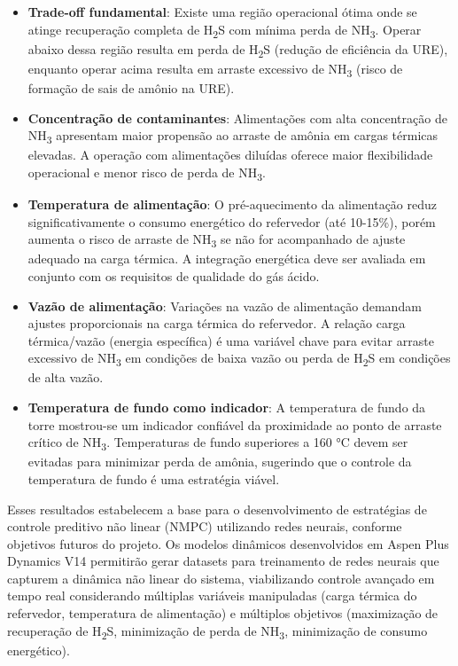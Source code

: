 \begin{itemize}[leftmargin=4em, itemsep=0pt]
  \item \textbf{Trade-off fundamental}: Existe uma região operacional ótima onde se atinge recuperação completa de H\textsubscript{2}S com mínima perda de NH\textsubscript{3}. Operar abaixo dessa região resulta em perda de H\textsubscript{2}S (redução de eficiência da URE), enquanto operar acima resulta em arraste excessivo de NH\textsubscript{3} (risco de formação de sais de amônio na URE).

  \item \textbf{Concentração de contaminantes}: Alimentações com alta concentração de NH\textsubscript{3} apresentam maior propensão ao arraste de amônia em cargas térmicas elevadas. A operação com alimentações diluídas oferece maior flexibilidade operacional e menor risco de perda de NH\textsubscript{3}.

  \item \textbf{Temperatura de alimentação}: O pré-aquecimento da alimentação reduz significativamente o consumo energético do refervedor (até 10-15\%), porém aumenta o risco de arraste de NH\textsubscript{3} se não for acompanhado de ajuste adequado na carga térmica. A integração energética deve ser avaliada em conjunto com os requisitos de qualidade do gás ácido.

  \item \textbf{Vazão de alimentação}: Variações na vazão de alimentação demandam ajustes proporcionais na carga térmica do refervedor. A relação carga térmica/vazão (energia específica) é uma variável chave para evitar arraste excessivo de NH\textsubscript{3} em condições de baixa vazão ou perda de H\textsubscript{2}S em condições de alta vazão.

  \item \textbf{Temperatura de fundo como indicador}: A temperatura de fundo da torre mostrou-se um indicador confiável da proximidade ao ponto de arraste crítico de NH\textsubscript{3}. Temperaturas de fundo superiores a 160 °C devem ser evitadas para minimizar perda de amônia, sugerindo que o controle da temperatura de fundo é uma estratégia viável.
\end{itemize}

Esses resultados estabelecem a base para o desenvolvimento de estratégias de controle preditivo não linear (NMPC) utilizando redes neurais, conforme objetivos futuros do projeto. Os modelos dinâmicos desenvolvidos em Aspen Plus Dynamics V14 permitirão gerar datasets para treinamento de redes neurais que capturem a dinâmica não linear do sistema, viabilizando controle avançado em tempo real considerando múltiplas variáveis manipuladas (carga térmica do refervedor, temperatura de alimentação) e múltiplos objetivos (maximização de recuperação de H\textsubscript{2}S, minimização de perda de NH\textsubscript{3}, minimização de consumo energético).



